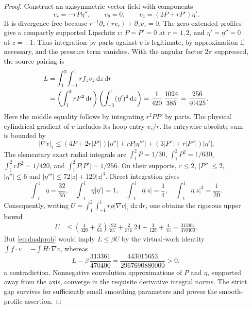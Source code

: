 \documentclass[11pt,a4paper]{article}
\theoremstyle{plain}
\theoremstyle{definition}
\newcommand{\dd}{\,\mathrm{d}}
\begin{document}
\begin{proof}
Construct an axisymmetric vector field with components
\begin{equation}\label{eq:dualtest}
 v_r=-rP\eta'',\qquad v_\theta=0,\qquad
 v_z=(2P+rP')\eta'.
\end{equation}
It is divergence-free because
$r^{-1}\partial_r(rv_r)+\partial_zv_z=0$.
The zero-extended profiles give a compactly supported Lipschitz $v$:
$P=P'=0$ at $r=1,2$, and $\eta'=\eta''=0$ at $z=\pm1$.
Thus integration by parts against $v$ is legitimate, by approximation
if necessary, and the pressure term vanishes. With the angular
factor $2\pi$ suppressed, the source pairing is
\begin{align}
 L&=\int_1^2\!\int_{-1}^1 r f_zv_z\dd z\dd r\notag\\
  &=\left(\int_1^2 rP^2\dd r\right)
    \left(\int_{-1}^1(\eta')^2\dd z\right)
    =\frac{1}{420}\,\frac{1024}{385}
    =\frac{256}{40425}.\label{eq:dualL}
\end{align}
Here the middle equality follows by integrating $r^2PP'$ by parts.
The physical cylindrical gradient of $v$ includes its hoop entry
$v_r/r$. Its entrywise absolute sum is bounded by
\begin{equation}\label{eq:dualgrad}
 |\nabla v|_1\le
 (4P+2r|P'|)|\eta''|+rP|\eta'''|
 +(3|P'|+r|P''|)|\eta'|.
\end{equation}
The elementary exact radial integrals are
$\int_1^2P=1/30$, $\int_1^2P^2=1/630$,
$\int_1^2rP^2=1/420$, and
$\int_1^2P|P'|=1/256$. On their supports,
$r\le2$, $|P''|\le2$, $|\eta''|\le6$ and
$|\eta'''|\le72|z|+120|z|^3$. Direct integration gives
\[
 \int_{-1}^1\eta=\frac{32}{35},\quad
 \int_{-1}^1\eta|\eta'|=1,\quad
 \int_{-1}^1\eta|z|=\frac14,\quad
 \int_{-1}^1\eta|z|^3=\frac1{20}.
\]
Consequently, writing $U=\int_1^2\int_{-1}^1
r\rho|\nabla v|_1\dd z\dd r$, one obtains the rigorous upper bound
\begin{align}
 U&\le\left(\frac4{420}+\frac2{64}\right)\frac{192}{35}
   +\frac2{315}\,24+\frac3{128}+\frac4{15}
   =\frac{313361}{470400}.\label{eq:dualU}
\end{align}
But \eqref{eq:dualprob} would imply $L\le\beta U$ by the virtual-work
identity $\int f\cdot v=-\int H:\nabla v$, whereas
\begin{equation}\label{eq:dualgap}
 L-\beta\,\frac{313361}{470400}
 =\frac{443015653}{2967690880000}>0,
\end{equation}
a contradiction. Nonnegative convolution approximations of $P$ and
$\eta$, supported away from the axis, converge in the requisite
derivative integral norms. The strict gap survives for sufficiently
small smoothing parameters and proves the smooth-profile assertion.
\end{proof}
\end{document}
